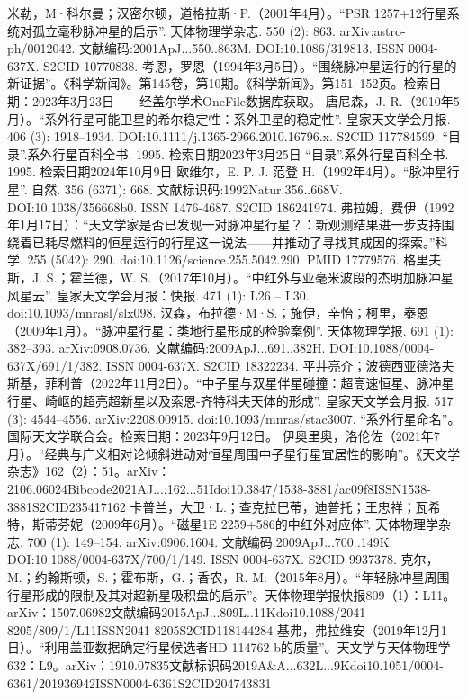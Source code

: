 米勒，M·科尔曼；汉密尔顿，道格拉斯·P.（2001年4月）。“PSR 1257+12行星系统对孤立毫秒脉冲星的启示”. 天体物理学杂志. 550 (2): 863. arXiv:astro-ph/0012042. 文献编码:2001ApJ...550..863M. DOI:10.1086/319813. ISSN 0004-637X. S2CID 10770838.
考恩，罗恩（1994年3月5日）。“围绕脉冲星运行的行星的新证据”。《科学新闻》。第145卷，第10期。《科学新闻》。第151–152页。检索日期：2023年3月23日——经盖尔学术OneFile数据库获取。
唐尼森，J. R.（2010年5月）。“系外行星可能卫星的希尔稳定性：系外卫星的稳定性”. 皇家天文学会月报. 406 (3): 1918–1934. DOI:10.1111/j.1365-2966.2010.16796.x. S2CID 117784599.
“目录”.系外行星百科全书. 1995. 检索日期2023年3月25日
“目录”.系外行星百科全书. 1995. 检索日期2024年10月9日
欧维尔，E. P. J. 范登 H.（1992年4月）。“脉冲星行星”. 自然. 356 (6371): 668. 文献标识码:1992Natur.356..668V. DOI:10.1038/356668b0. ISSN 1476-4687. S2CID 186241974.
弗拉姆，费伊（1992年1月17日）：“天文学家是否已发现一对脉冲星行星？：新观测结果进一步支持围绕着已耗尽燃料的恒星运行的行星这一说法——并推动了寻找其成因的探索。”科学. 255 (5042): 290. doi:10.1126/science.255.5042.290. PMID 17779576.
格里夫斯，J. S.；霍兰德，W. S.（2017年10月）。“中红外与亚毫米波段的杰明加脉冲星风星云”. 皇家天文学会月报：快报. 471 (1): L26 – L30. doi:10.1093/mnrasl/slx098.
汉森，布拉德·M·S.；施伊，辛怡；柯里，泰恩（2009年1月）。“脉冲星行星：类地行星形成的检验案例”. 天体物理学报. 691 (1): 382–393. arXiv:0908.0736. 文献编码:2009ApJ...691..382H. DOI:10.1088/0004-637X/691/1/382. ISSN 0004-637X. S2CID 18322234.
平井亮介；波德西亚德洛夫斯基，菲利普（2022年11月2日）。“中子星与双星伴星碰撞：超高速恒星、脉冲星行星、崎岖的超亮超新星以及索恩-齐特科夫天体的形成”. 皇家天文学会月报. 517 (3): 4544–4556. arXiv:2208.00915. doi:10.1093/mnras/stac3007.
“系外行星命名”。国际天文学联合会。检索日期：2023年9月12日。
伊奥里奥，洛伦佐（2021年7月）。“经典与广义相对论倾斜进动对恒星周围中子星行星宜居性的影响”。《天文学杂志》162（2）：51。arXiv：2106.06024Bibcode2021AJ....162...51Idoi10.3847/1538-3881/ac09f8ISSN1538-3881S2CID235417162
卡普兰，大卫·L.；查克拉巴蒂，迪普托；王忠祥；瓦希特，斯蒂芬妮（2009年6月）。“磁星1E 2259+586的中红外对应体”. 天体物理学杂志. 700 (1): 149–154. arXiv:0906.1604. 文献编码:2009ApJ...700..149K. DOI:10.1088/0004-637X/700/1/149. ISSN 0004-637X. S2CID 9937378.
克尔，M.；约翰斯顿，S.；霍布斯，G.；香农，R. M.（2015年8月）。“年轻脉冲星周围行星形成的限制及其对超新星吸积盘的启示”。天体物理学报快报809（1）：L11。arXiv：1507.06982文献编码2015ApJ...809L..11Kdoi10.1088/2041-8205/809/1/L11ISSN2041-8205S2CID118144284
基弗，弗拉维安（2019年12月1日）。“利用盖亚数据确定行星候选者HD 114762 b的质量”。天文学与天体物理学632：L9。arXiv：1910.07835文献标识码2019A&A...632L...9Kdoi10.1051/0004-6361/201936942ISSN0004-6361S2CID204743831
